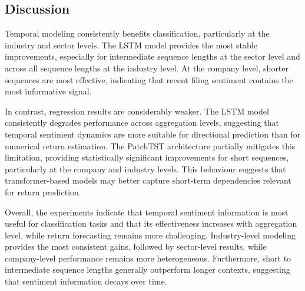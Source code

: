 \subsection{Discussion}

Temporal modeling consistently benefits classification, particularly at the industry and sector levels. The LSTM model provides the most stable improvements, especially for intermediate sequence lengths at the sector level and across all sequence lengths at the industry level. At the company level, shorter sequences are most effective, indicating that recent filing sentiment contains the most informative signal.

In contrast, regression results are considerably weaker. The LSTM model consistently degrades performance across aggregation levels, suggesting that temporal sentiment dynamics are more suitable for directional prediction than for numerical return estimation. The PatchTST architecture partially mitigates this limitation, providing statistically significant improvements for short sequences, particularly at the company and industry levels. This behaviour suggests that transformer-based models may better capture short-term dependencies relevant for return prediction.

Overall, the experiments indicate that temporal sentiment information is most useful for classification tasks and that its effectiveness increases with aggregation level, while return forecasting remains more challenging. 
Industry-level modeling provides the most consistent gains, followed by sector-level results, while company-level performance remains more heterogeneous. Furthermore, short to intermediate sequence lengths generally outperform longer contexts, suggesting that sentiment information decays over time.